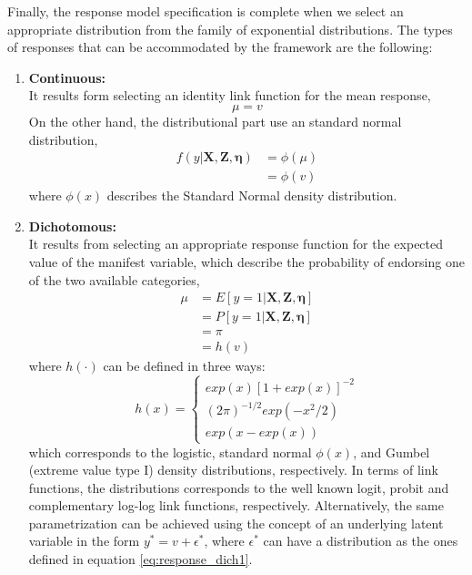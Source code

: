 Finally, the response model specification is complete when we select an appropriate distribution from the family of exponential distributions. The types of responses that can be accommodated by the framework are the following:

\begin{enumerate}
	
	\item \textbf{Continuous:} \\
	It results form selecting an identity link function for the mean response,
	\begin{equation} \label{eq:link_cont}
	\mu = v
	\end{equation}
	On the other hand, the distributional part use an standard normal distribution,
	\begin{equation} \label{eq:dist_cont}
		\begin{split}
		f(y| \mathbf{X}, \mathbf{Z}, \pmb{\eta}) &= \phi(\mu) \\
		&= \phi(v)
		\end{split}
	\end{equation}
	where $\phi(x)$ describes the Standard Normal density distribution. 
	
	
	
	\item \textbf{Dichotomous:} \\
	It results from selecting an appropriate response function for the expected value of the manifest variable, which describe the probability of endorsing one of the two available categories,
	\begin{equation} \label{eq:link_dich}
		\begin{split}
		\mu &= E[y=1 | \mathbf{X}, \mathbf{Z}, \pmb{\eta}] \\ 
		&= P[y=1 | \mathbf{X}, \mathbf{Z}, \pmb{\eta}] \\
		&= \pi \\
		&= h(v)
		\end{split}	
	\end{equation}
	where $h(\cdot)$ can be defined in three ways:	
	\begin{equation} \label{eq:response_dich1}
		h(x) = 
		\begin{cases}
		exp(x)[1 + exp(x)]^{-2} \\
		(2 \pi )^{-1/2} exp(-x^{2}/2) \\
		exp(x - exp(x))
		\end{cases}
	\end{equation}
	which corresponds to the logistic, standard normal $\phi(x)$, and Gumbel (extreme value type I) density  distributions, respectively. In terms of link functions, the distributions corresponds to the well known logit, probit and complementary log-log link functions, respectively. Alternatively, the same parametrization can be achieved using the concept of an underlying latent variable in the form $y^{*} = v + \epsilon^{*}$, where $\epsilon^{*}$ can have a distribution as the ones defined in equation \ref{eq:response_dich1}.
	

\end{enumerate}
